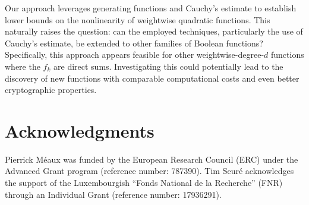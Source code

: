 \documentclass[11pt]{llncs}
\begin{document}
Our approach leverages generating functions and Cauchy’s estimate to establish lower bounds on the nonlinearity of weightwise quadratic functions. 
This naturally raises the question: can the employed techniques, particularly the use of Cauchy’s estimate, be extended to other families of Boolean functions? Specifically, this approach appears feasible for other weightwise-degree-$d$ functions where the $f_k$ are direct sums. 
Investigating this could potentially lead to the discovery of new functions with comparable computational costs and even better cryptographic properties.


\ifnum{}
	\section{Acknowledgments}
	Pierrick Méaux was funded by the European Research Council (\textsf{ERC}) under the Advanced Grant program (reference number: 787390). Tim Seuré acknowledges the support of the Luxembourgish “Fonds National de la Recherche” (\textsf{FNR}) through an Individual Grant (reference number: 17936291).
\fi

\newpage

\ifnum{}
	
	
\else
	
	
\fi
\end{document}
